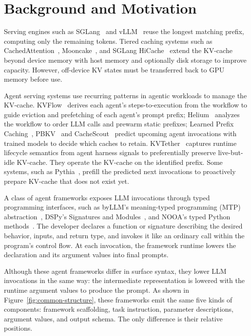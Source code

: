 \section{Background and Motivation}
\label{sec:bg_mt}
Serving engines such as SGLang~\cite{zheng2024sglang} and vLLM~\cite{kwon2023pagedattention} reuse the longest matching prefix, computing only the remaining tokens. Tiered caching systems such as CachedAttention~\cite{gao2024cachedattention}, Mooncake~\cite{qin2025mooncake}, and SGLang HiCache~\cite{sglang2026hicache} extend the KV-cache beyond device memory with host memory and optionally disk storage to improve capacity. However, off-device KV states must be transferred back to GPU memory before use.


Agent serving systems use recurring patterns in agentic workloads to manage the KV-cache. KVFlow~\cite{pan2025kvflow} derives each agent's steps-to-execution from the workflow to guide eviction and prefetching of each agent's prompt prefix; Helium~\cite{wadlom2026helium} analyzes the workflow to order LLM calls and prewarm static prefixes; Learned Prefix Caching~\cite{yang2025lpc}, PBKV~\cite{zheng2026pbkv} and CacheScout~\cite{zhang2026cachescout} predict upcoming agent invocations with trained models to decide which caches to retain. KVTether~\cite{fu2026kvtether} captures runtime lifecycle semantics from agent harness signals to preferentially preserve live-but-idle KV-cache. They operate the KV-cache on the identified prefix. Some systems, such as Pythia~\cite{yu2026pythia}, prefill the predicted next invocations to proactively prepare KV-cache that does not exist yet. 

A class of agent frameworks exposes LLM invocations through typed programming interfaces, such as byLLM's meaning-typed programming (MTP) abstraction~\cite{dantanarayana2025mtp}, DSPy's Signatures and Modules~\cite{khattab2024dspy}, and NOOA's typed Python methods~\cite{furgale2026nooa}. The developer declares a function or signature describing the desired behavior, inputs, and return type, and invokes it like an ordinary call within the program's control flow. At each invocation, the framework runtime lowers the declaration and its argument values into final prompts.



Although these agent frameworks differ in surface syntax, they lower LLM invocations in the same way: the intermediate representation is lowered with the runtime argument values to produce the prompt. As shown in Figure~\ref{fig:common-structure}, these frameworks emit the same five kinds of components: framework scaffolding, task instruction, parameter descriptions, argument values, and output schema. The only difference is their relative positions. 


